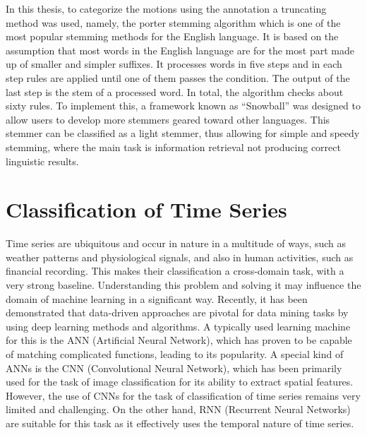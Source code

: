 		In this thesis, to categorize the motions using the annotation a truncating method was used, namely, the porter stemming algorithm which is one of the most popular stemming methods for the English language. It is based on the assumption that most words in the English language are for the most part made up of smaller and simpler suffixes. It processes words in five steps and in each step rules are applied until one of them passes the condition. The output of the last step is the stem of a processed word. In total, the algorithm checks about sixty rules. To implement this, a framework known as ``Snowball'' was designed to allow users to develop more stemmers geared toward other languages. This stemmer can be classified as a light stemmer, thus allowing for simple and speedy stemming, where the main task is information retrieval not producing correct linguistic results.\cite{jivani2011comparative}
	\section{Classification of Time Series}
		Time series are ubiquitous and occur in nature in a multitude of ways, such as weather patterns and physiological signals, and also in human activities, such as financial recording. This makes their classification a cross-domain task, with a very strong baseline. Understanding this problem and solving it may influence the domain of machine learning in a significant way\cite{wang2017time}. Recently, it has been demonstrated that data-driven approaches are pivotal for data mining tasks by using deep learning methods and algorithms. A typically used learning machine for this is the ANN (Artificial Neural Network), which has proven to be capable of matching complicated functions, leading to its popularity. A special kind of ANNs is the CNN (Convolutional Neural Network), which has been primarily used for the task of image classification for its ability to extract spatial features. However, the use of CNNs for the task of classification of time series remains very limited and challenging. On the other hand, RNN (Recurrent Neural Networks) are suitable for this task as it effectively uses the temporal nature of time series.\cite{yang2019time}
